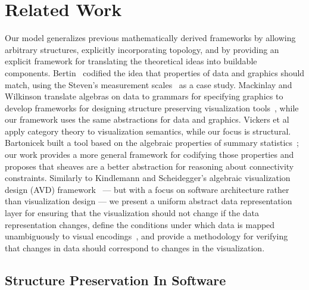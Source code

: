 \documentclass{vgtc}
\theoremstyle{definition}
\theoremstyle{remark}
\begin{document}
\section{Related Work}
\label{sec:related-work}
Our model generalizes previous mathematically derived frameworks by allowing arbitrary structures, explicitly incorporating topology, and by providing an explicit framework for translating the theoretical ideas into buildable components. Bertin~\cite{bertinSemiologyGraphicsDiagrams2011} codified the idea that properties of data and graphics should match, using the Steven's measurement scales~\cite{stevensTheoryScalesMeasurement1946} as a case study. Mackinlay and Wilkinson translate algebras on data to grammars for specifying graphics to develop frameworks for designing structure preserving visualization tools~\cite{mackinlayAutomatingDesignGraphical1986,mackinlayAutomaticDesignGraphical1987, wilkinsonGrammarGraphics2005}, while our framework uses the same abstractions for data and graphics. Vickers et al~\cite{vickersUnderstandingVisualizationFormal2013} apply category theory to visualization semantics, while our focus is structural. Bartonicek built a tool based on the algebraic properties of summary statistics~\cite{bartonicekNoMoreNo2025}; our work provides a more general framework for codifying those properties and proposes that sheaves are a better abstraction for reasoning about connectivity constraints. Similarly to Kindlemann and Scheidegger's algebraic visualization design (AVD) framework~\cite{kindlmannAlgebraicProcessVisualization2014} --- but with a focus on software architecture rather than visualization design --- we present a uniform abstract data representation layer for ensuring that the visualization should not change if the data representation changes, define the conditions under which data is mapped unambiguously to visual encodings~\cite{ziemkiewiczEmbeddingInformationVisualization2009}, and provide a methodology for verifying that changes in data should correspond to changes in the visualization.


\subsection{Structure Preservation In Software}
\label{sec:related-work:software}
\end{document}
